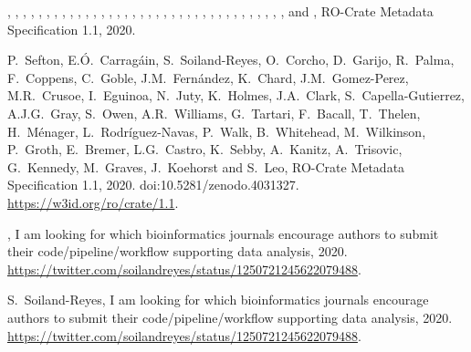 \documentclass[ds,v1.1.2,openaccess]{iosart2x}%
\begin{document}
\begin{thebibliography}{}
%
\begin{botherref}
,
,
,
,
,
,
,
,
,
,
,
,
,
,
,
,
,
,
,
,
,
,
,
,
,
,
,
,
,
,
,
,
,
,
,
,
 and
,
{RO}-Crate Metadata Specification 1.1,
2020.
\end{botherref}
%
\OrigBibText
P.~Sefton,
E.{\'{O}}.~Carrag\'{a}in,
S.~Soiland-Reyes,
O.~Corcho,
D.~Garijo,
R.~Palma,
F.~Coppens,
C.~Goble,
J.M.~Fern\'{a}ndez,
K.~Chard,
J.M.~Gomez-Perez,
M.R.~Crusoe,
I.~Eguinoa,
N.~Juty,
K.~Holmes,
J.A.~Clark,
S.~Capella-Gutierrez,
A.J.G.~Gray,
S.~Owen,
A.R.~Williams,
G.~Tartari,
F.~Bacall,
T.~Thelen,
H.~M\'{e}nager,
L.~Rodr\'iguez-Navas,
P.~Walk,
B.~Whitehead,
M.~Wilkinson,
P.~Groth,
E.~Bremer,
L.G.~Castro,
K.~Sebby,
A.~Kanitz,
A.~Trisovic,
G.~Kennedy,
M.~Graves,
J.~Koehorst and
S.~Leo,
{RO}-Crate Metadata Specification 1.1,
2020.
doi:10.5281/zenodo.4031327.
\url{https://w3id.org/ro/crate/1.1}.
\endOrigBibText
{}
\endbibitem

%
\begin{botherref}
,
I am looking for which bioinformatics journals encourage authors
to submit their code/pipeline/workflow supporting data analysis,
2020.
\url{https://twitter.com/soilandreyes/status/1250721245622079488}.
\end{botherref}
%
\OrigBibText
S.~Soiland-Reyes,
I am looking for which bioinformatics journals encourage authors to submit
their code/pipeline/workflow supporting data analysis,
2020.
\url{https://twitter.com/soilandreyes/status/1250721245622079488}.
\endOrigBibText
{}
\endbibitem


\end{thebibliography}
\end{document}
